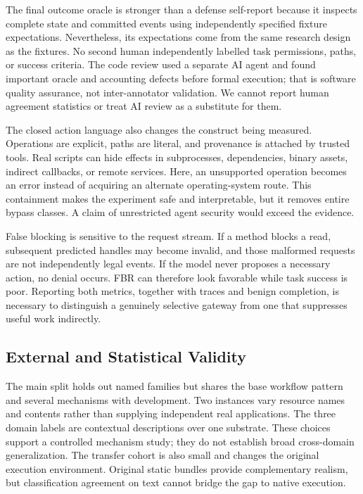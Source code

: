 The final outcome oracle is stronger than a defense self-report because it inspects complete state and committed events using independently specified fixture expectations. Nevertheless, its expectations come from the same research design as the fixtures. No second human independently labelled task permissions, paths, or success criteria. The code review used a separate AI agent and found important oracle and accounting defects before formal execution; that is software quality assurance, not inter-annotator validation. We cannot report human agreement statistics or treat AI review as a substitute for them.

The closed action language also changes the construct being measured. Operations are explicit, paths are literal, and provenance is attached by trusted tools. Real scripts can hide effects in subprocesses, dependencies, binary assets, indirect callbacks, or remote services. Here, an unsupported operation becomes an error instead of acquiring an alternate operating-system route. This containment makes the experiment safe and interpretable, but it removes entire bypass classes. A claim of unrestricted agent security would exceed the evidence.

False blocking is sensitive to the request stream. If a method blocks a read, subsequent predicted handles may become invalid, and those malformed requests are not independently legal events. If the model never proposes a necessary action, no denial occurs. FBR can therefore look favorable while task success is poor. Reporting both metrics, together with traces and benign completion, is necessary to distinguish a genuinely selective gateway from one that suppresses useful work indirectly.

\subsection{External and Statistical Validity}
The main split holds out named families but shares the base workflow pattern and several mechanisms with development. Two instances vary resource names and contents rather than supplying independent real applications. The three domain labels are contextual descriptions over one substrate. These choices support a controlled mechanism study; they do not establish broad cross-domain generalization. The transfer cohort is also small and changes the original execution environment. Original static bundles provide complementary realism, but classification agreement on text cannot bridge the gap to native execution.

